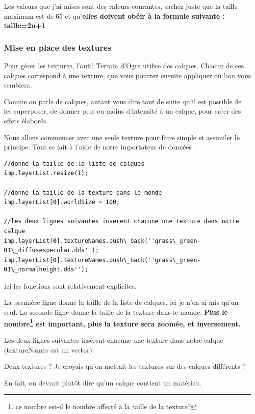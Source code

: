 Les valeurs que j'ai mises sont des valeurs courantes, sachez juste que la taille maximum est de 65 et qu'\textbf{elles doivent obéir à la formule suivante :
taille=2n+1}



\subsubsection{Mise en place des textures}

Pour gérer les textures, l'outil Terrain d'Ogre utilise des calques. Chacun de ces calques correspond à une texture, que vous pourrez ensuite appliquer où bon vous semblera.

Comme on parle de calques, autant vous dire tout de suite qu'il est possible de les superposer, de donner plus ou moins d'intensité à un calque, pour créer des effets élaborés.

Nous allons commencer avec une seule texture pour faire simple et assimiler le principe. Tout se fait à l'aide de notre importateur de données :

\begin{lstlisting}[caption={Mise en place d'une texture pour le terrain}]
//donne la taille de la liste de calques
imp.layerList.resize(1);

//donne la taille de la texture dans le monde
imp.layerList[0].worldSize = 100;  

//les deux lignes suivantes inserent chacune une texture dans notre calque
imp.layerList[0].textureNames.push\_back(''grass\_green-01\_diffusespecular.dds'');
imp.layerList[0].textureNames.push\_back(''grass\_green-01\_normalheight.dds'');
\end{lstlisting}

Ici les fonctions sont relativement explicites.

La première ligne donne la taille de la liste de calques, ici je n'en ai mis qu'un seul. La seconde ligne donne la taille de la texture dans le monde. \textbf{Plus le nombre\footnote{ce nombre est-il le nombre affecté à la taille de la texture?} est important, plus la texture sera zoomée, et inversement.}

Les deux lignes suivantes insèrent chacune une texture dans notre calque (textureNames est un vector).

Deux textures ? Je croyais qu'on mettait les textures sur des calques différents ?

En fait, on devrait plutôt dire qu'un calque contient un matériau.

